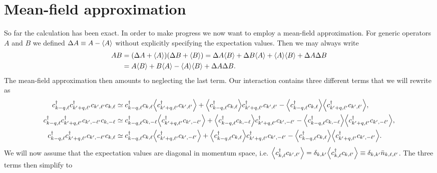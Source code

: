 \documentclass[english, parskip=full]{scrartcl}
\begin{document}
\section{Mean-field approximation}
So far the calculation has been exact.
In order to make progress we now want to employ a mean-field approximation.
For generic operators $A$ and $B$ we defined $\Delta A \equiv A - \bra*{A}$ without explicitly specifying the expectation values.
Then we may always write
\begin{align}
AB &= \kla*{\Delta A + \bra*{A}} \kla*{\Delta B + \bra*{B}} = \Delta A \bra*{B} + \Delta B \bra*{A} + \bra*{A} \bra*{B} + \Delta A \Delta B\\
&= A\bra*{B} + B\bra*{A} - \bra*{A} \bra*{B} + \Delta A \Delta B.\label{eqn:mf approx}
\end{align}
The mean-field approximation then amounts to neglecting the last term.
Our interaction contains three different terms that we will rewrite as
\begin{align}
c_{k-q,\ell}^\dagger c_{k'+q,\ell'}^\dagger c_{k',\ell'} c_{k,\ell} &\simeq c_{k-q,\ell}^\dagger c_{k,\ell} \bra*{c_{k'+q,\ell'}^\dagger c_{k',\ell'}} + \bra*{c_{k-q,\ell}^\dagger c_{k,\ell}} c_{k'+q,\ell'}^\dagger c_{k',\ell'} - \bra*{c_{k-q,\ell}^\dagger c_{k,\ell}} \bra*{c_{k'+q,\ell'}^\dagger c_{k',\ell'}},\\
c_{k-q,\ell}^\dagger c_{k'+q,\ell'}^\dagger c_{k',-\ell'} c_{k,-\ell} &\simeq c_{k-q,\ell}^\dagger c_{k,-\ell} \bra*{c_{k'+q,\ell'}^\dagger c_{k',-\ell'}} + \bra*{c_{k-q,\ell}^\dagger c_{k,-\ell}} c_{k'+q,\ell'}^\dagger c_{k',-\ell'} - \bra*{c_{k-q,\ell}^\dagger c_{k,-\ell}} \bra*{c_{k'+q,\ell'}^\dagger c_{k',-\ell'}},\\
c_{k-q,\ell}^\dagger c_{k'+q,\ell'}^\dagger c_{k',-\ell'} c_{k,\ell} &\simeq c_{k-q,\ell}^\dagger c_{k,\ell} \bra*{c_{k'+q,\ell'}^\dagger c_{k',-\ell'}} + \bra*{c_{k-q,\ell}^\dagger c_{k,\ell}} c_{k'+q,\ell'}^\dagger c_{k',-\ell'} - \bra*{c_{k-q,\ell}^\dagger c_{k,\ell}} \bra*{c_{k'+q,\ell'}^\dagger c_{k',-\ell'}}.
\end{align}
We will now assume that the expectation values are diagonal in momentum space, i.e. $\bra*{c_{k,\ell}^\dagger c_{k',\ell'}} = \delta_{k,k'} \bra*{c_{k,\ell}^\dagger c_{k,\ell'}} \equiv \delta_{k,k'} \bar{n}_{k,\ell,\ell'}$.
The three terms then simplify to
\end{document}

